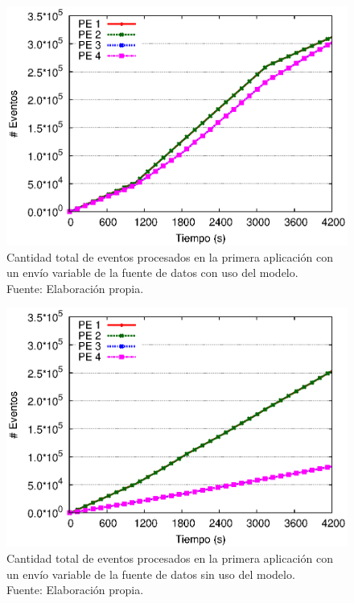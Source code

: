 \begin{figure}[!ht]
	\centering
	\captionsetup{justification=centering}
    \includegraphics[scale=0.7]{images/exp/app1/normal/cm/eventCount.eps}
    \caption[Cantidad total de eventos procesados en la primera aplicaci\'on con un env\'io variable de la fuente de datos con uso del modelo.]{Cantidad total de eventos procesados en la primera aplicaci\'on con un env\'io variable de la fuente de datos con uso del modelo.\\Fuente: Elaboraci\'on propia.}
    \label{fig:app1-normal-eventCount-cm}
\end{figure}

\begin{figure}[!ht]
	\centering
	\captionsetup{justification=centering}
    \includegraphics[scale=0.7]{images/exp/app1/normal/sm/eventCount.eps}
    \caption[Cantidad total de eventos procesados en la primera aplicaci\'on con un env\'io variable de la fuente de datos sin uso del modelo.]{Cantidad total de eventos procesados en la primera aplicaci\'on con un env\'io variable de la fuente de datos sin uso del modelo.\\Fuente: Elaboraci\'on propia.}
    \label{fig:app1-normal-eventCount-sm}
\end{figure}

